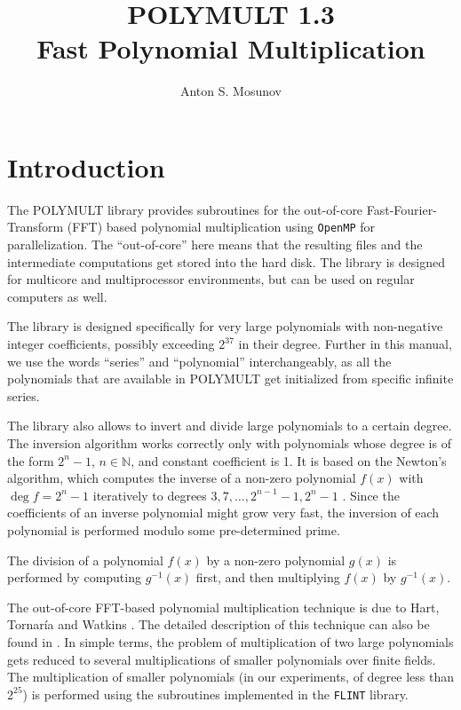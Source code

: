 \documentclass[a4paper,10pt]{article}
\title{POLYMULT 1.3\\Fast Polynomial Multiplication}
\author{Anton S. Mosunov}
\newcommand{\code}{\lstinline}
\begin{document}
\maketitle
\tableofcontents
\lstset{language=c}
\lstset{basicstyle=\ttfamily}
\lstset{keywordstyle=}
\lstset{escapeinside=\%\%}





\section{Introduction}

The POLYMULT library provides subroutines for the out-of-core Fast-Fourier-Transform (FFT) based polynomial multiplication using \code{OpenMP} for parallelization. The ``out-of-core'' here means that the resulting files and the intermediate computations get stored into the hard disk. The library is designed for multicore and multiprocessor environments, but can be used on regular computers as well.

The library is designed specifically for very large polynomials with non-negative integer coefficients, possibly exceeding $2^{37}$ in their degree. Further in this manual, we use the words ``series'' and ``polynomial'' interchangeably, as all the polynomials that are available in POLYMULT get initialized from specific infinite series.

The library also allows to invert and divide large polynomials to a certain degree. The inversion algorithm works correctly only with polynomials whose degree is of the form $2^n-1$, $n \in \mathbb N$, and constant coefficient is 1. It is based on the Newton's algorithm, which computes the inverse of a non-zero polynomial $f(x)$ with $\deg f = 2^n - 1$ iteratively to degrees $3, 7, \ldots, 2^{n-1} - 1, 2^n - 1$ \cite[Algorithm 9.3]{gathen}. Since the coefficients of an inverse polynomial might grow very fast, the inversion of each polynomial is performed modulo some pre-determined prime.

The division of a polynomial $f(x)$ by a non-zero polynomial $g(x)$ is performed by computing $g^{-1}(x)$ first, and then multiplying $f(x)$ by $g^{-1}(x)$.

The out-of-core FFT-based polynomial multiplication technique is due to Hart, Tornar\'ia and Watkins \cite{hart}. The detailed description of this technique can also be found in \cite[Section 4]{mosunov}. In simple terms, the problem of multiplication of two large polynomials gets reduced to several multiplications of smaller polynomials over finite fields. The multiplication of smaller polynomials (in our experiments, of degree less than $2^{25}$) is performed using the subroutines implemented in the \code{FLINT} library.
\end{document}
